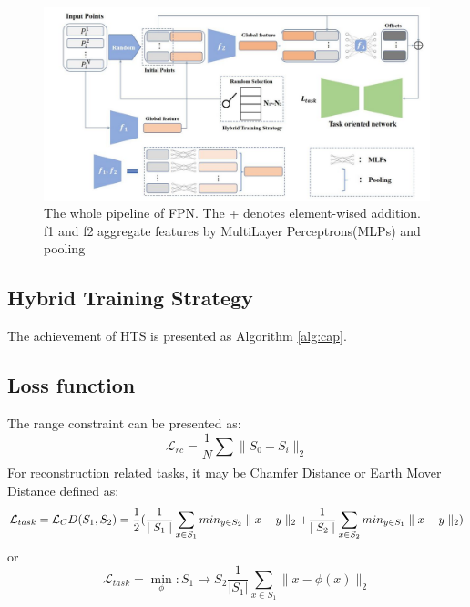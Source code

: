 \documentclass[review]{article}
\begin{document}
\subsection*{}
\begin{figure}[H]
    \centering
    \includegraphics{pic4.jpg}
    \caption{The whole pipeline of FPN. The + denotes element-wised addition. f1 and f2 aggregate features by MultiLayer Perceptrons(MLPs) and pooling}
    \label{fig:pic4}
\end{figure}

\subsection{Hybrid Training Strategy}
The achievement of HTS is presented as Algorithm \ref{alg:cap}.
\subsection{Loss function}
The range constraint can be presented as:
\begin{equation}
    \mathcal{L}_{rc}=\frac{1}{N}\displaystyle\sum\limits_{}\parallel S_0 - S_i\parallel_2
\end{equation}
For reconstruction related tasks, it may be Chamfer Distance or Earth Mover Distance \cite{lang2020samplenet} defined as:
\begin{equation}
    \mathcal{L}_{task}=\mathcal{L}_CD(S_1,S_2)\\
    =\frac{1}{2}
(
    \frac{1}{\mid S_1 \mid}\sum_{x\in S_1} min_{y\in S_2} \parallel x-y \parallel_2 +
    \frac{1}{\mid S_2 \mid}\sum_{x\in S_2} min_{y\in S_1} \parallel x-y \parallel_2
)
\end{equation}
or
\begin{equation}
    {\mathcal{L}}_{task}=\min_\phi : S_1\longrightarrow S_2 \frac{1}{\lvert S_1 \lvert} \displaystyle\sum\limits_{x\in S_1} 
\parallel x-\phi(x)\parallel_2
\end{equation}
            
\end{document}
